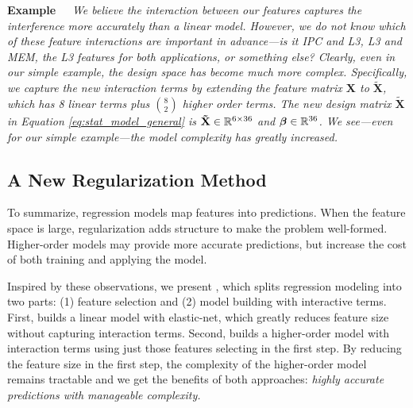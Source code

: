 \noindent \textbf{Example~~}\textit{ We believe the interaction
  between our features captures the interference more accurately than
  a linear model.  However, we do not know which of these feature
  interactions are important in advance---\eg is it IPC and L3, L3 and
  MEM, the L3 features for both applications, or something else?
  Clearly, even in our simple example, the design space has become
  much more complex.  Specifically, we capture the new interaction
  terms by extending the feature matrix $\mathbf{X}$ to
  $\mathbf{\tilde{X}}$, which has 8 linear terms plus ${8 \choose 2}$
  higher order terms. The new design matrix $\mathbf{\tilde{X}}$ in
  Equation \eqref{eq:stat_model_general} is $\mathbf{\tilde{X}} \in
  \mathbb{R}^{6 \times 36}$ and $\boldsymbol{\beta} \in \mathbb{R}^{36}$. We
  see---even for our simple example---the model complexity has greatly
  increased.  }

 
\subsection{ A New Regularization Method}
\label{sec:est:system}
To summarize, regression models map features into predictions.  When
the feature space is large, regularization adds structure to make the
problem well-formed.  Higher-order models may provide more accurate
predictions, but increase the cost of both training and applying the
model.

Inspired by these observations, we present \SYSTEM{}, which splits
regression modeling into two parts: (1) feature selection and (2)
model building with interactive terms.  First, \SYSTEM{} builds a
linear model with elastic-net, which greatly reduces feature size
without capturing interaction terms.  Second, \SYSTEM{} builds a
higher-order model with interaction terms using just those features
selecting in the first step.  By reducing the feature size in the
first step, the complexity of the higher-order model remains tractable
and we get the benefits of both approaches: \emph{highly accurate
  predictions with manageable complexity.}


